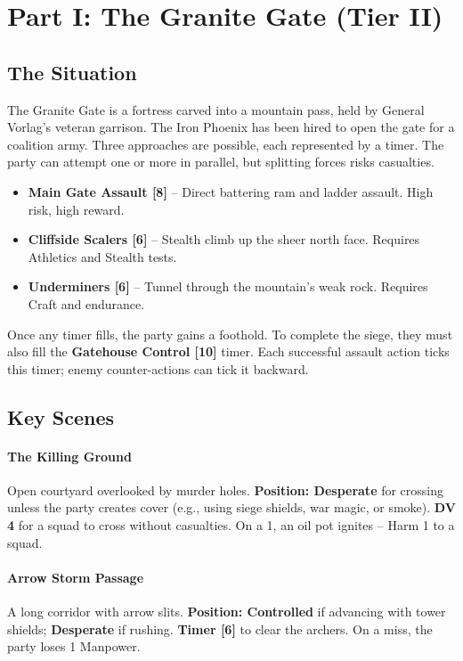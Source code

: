 \documentclass[11pt]{article}
\begin{document}
\section*{Part I: The Granite Gate (Tier II)}

\subsection*{The Situation}
The Granite Gate is a fortress carved into a mountain pass, held by General Vorlag's veteran garrison. The Iron Phoenix has been hired to open the gate for a coalition army. Three approaches are possible, each represented by a timer. The party can attempt one or more in parallel, but splitting forces risks casualties.

\begin{itemize}
\item \textbf{Main Gate Assault [8]} -- Direct battering ram and ladder assault. High risk, high reward.
\item \textbf{Cliffside Scalers [6]} -- Stealth climb up the sheer north face. Requires Athletics and Stealth tests.
\item \textbf{Underminers [6]} -- Tunnel through the mountain's weak rock. Requires Craft and endurance.
\end{itemize}

Once any timer fills, the party gains a foothold. To complete the siege, they must also fill the \textbf{Gatehouse Control [10]} timer. Each successful assault action ticks this timer; enemy counter-actions can tick it backward.

\subsection*{Key Scenes}

\paragraph{The Killing Ground}
Open courtyard overlooked by murder holes. \textbf{Position: Desperate} for crossing unless the party creates cover (e.g., using siege shields, war magic, or smoke). \textbf{DV 4} for a squad to cross without casualties. On a 1, an oil pot ignites -- Harm 1 to a squad.

\paragraph{Arrow Storm Passage}
A long corridor with arrow slits. \textbf{Position: Controlled} if advancing with tower shields; \textbf{Desperate} if rushing. \textbf{Timer [6]} to clear the archers. On a miss, the party loses 1 Manpower.
\end{document}
